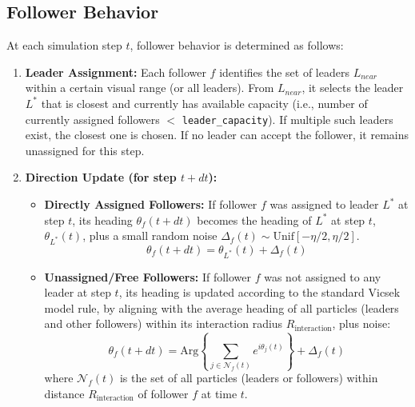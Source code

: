 \documentclass[11pt]{article}
\begin{document}
\subsection{Follower Behavior}
At each simulation step $t$, follower behavior is determined as follows:
\begin{enumerate}
    \item \textbf{Leader Assignment:} Each follower $f$ identifies the set of leaders $L_{near}$ within a certain visual range (or all leaders). From $L_{near}$, it selects the leader $L^*$ that is closest and currently has available capacity (i.e., number of currently assigned followers $<$ \texttt{leader\_capacity}). If multiple such leaders exist, the closest one is chosen. If no leader can accept the follower, it remains unassigned for this step.
    \item \textbf{Direction Update (for step $t+dt$):}
    \begin{itemize}
        \item \textbf{Directly Assigned Followers:} If follower $f$ was assigned to leader $L^*$ at step $t$, its heading $\theta_f(t+dt)$ becomes the heading of $L^*$ at step $t$, $\theta_{L^*}(t)$, plus a small random noise $\Delta_f(t) \sim \mathrm{Unif}[-\eta/2, \eta/2]$.
        \begin{equation}
            \theta_f(t+dt) = \theta_{L^*}(t) + \Delta_f(t)
        \end{equation}
        \item \textbf{Unassigned/Free Followers:} If follower $f$ was not assigned to any leader at step $t$, its heading is updated according to the standard Vicsek model rule, by aligning with the average heading of all particles (leaders and other followers) within its interaction radius $R_{\text{interaction}}$, plus noise:
        \begin{equation}
            \theta_f(t+dt) = \mathrm{Arg}\!\left\{\sum_{j \in \mathcal{N}_f(t)} e^{i\theta_j(t)}\right\} + \Delta_f(t)
        \end{equation}
        where $\mathcal{N}_f(t)$ is the set of all particles (leaders or followers) within distance $R_{\text{interaction}}$ of follower $f$ at time $t$.
    \end{itemize}
\end{enumerate}
\end{document}

